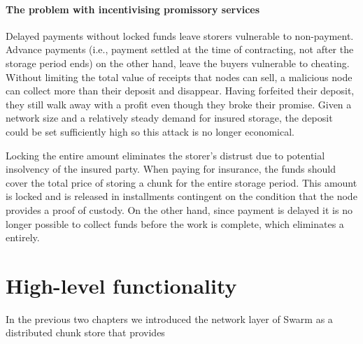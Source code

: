 \subsubsection{The problem with incentivising promissory services}

Delayed payments without locked funds leave storers vulnerable to non-payment. Advance payments (i.e., payment settled at the time of contracting, not after the storage period ends) on the other hand, leave the buyers vulnerable to cheating. Without limiting the total value of receipts that nodes can sell, a malicious node can collect more than their deposit and disappear. Having forfeited their deposit, they still walk away with a profit even though they broke their promise. Given a network size and a relatively steady demand for insured storage, the deposit could be set sufficiently high so this attack is no longer economical.

Locking the entire amount eliminates the storer's distrust due to potential insolvency of the insured party. When paying for insurance, the funds should cover the total price of storing a chunk for the entire storage period. This amount is locked and is released in installments contingent on the condition that the node provides a proof of custody. On the other hand, since payment is delayed it is no longer possible to collect funds before the work is complete, which eliminates a  entirely.



\chapter{High-level functionality}\label{sec:high-level-functionality}


In the previous two chapters we introduced the network layer of Swarm as a distributed chunk store that provides 

